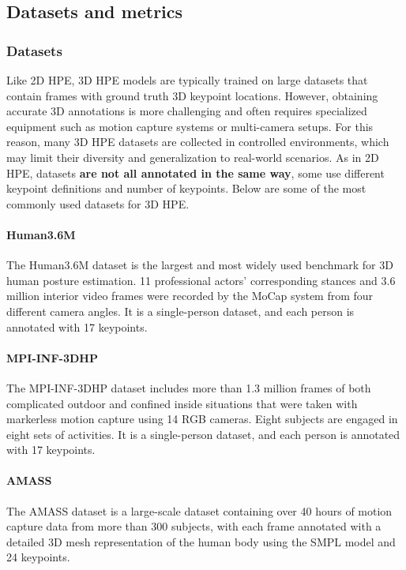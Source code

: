 \subsection{Datasets and metrics}

\subsubsection{Datasets}
Like 2D HPE, 3D HPE models are typically trained on large datasets that contain frames with ground truth 3D keypoint locations. However, obtaining accurate 3D annotations is more challenging and often requires 
specialized equipment such as motion capture systems or multi-camera setups. For this reason, many 3D HPE datasets are collected in controlled environments, which may limit their diversity and generalization to real-world scenarios.
As in 2D HPE, datasets \textbf{are not all annotated in the same way}, some use different keypoint definitions and number of keypoints. Below are some of the most commonly used datasets for 3D HPE.

\paragraph{Human3.6M}
The Human3.6M dataset \cite{ionescu2013human3} is the largest and most widely used benchmark for 3D human posture estimation. 11 professional actors' corresponding stances and 3.6 million interior video frames were recorded by the MoCap system from four different 
camera angles. It is a single-person dataset, and each person is annotated with 17 keypoints.

\paragraph{MPI-INF-3DHP}
The MPI-INF-3DHP dataset \cite{mehta2017monocular} includes more than 1.3 million frames of both complicated outdoor and confined inside situations that were taken with markerless motion capture using 14 RGB cameras. Eight subjects are engaged in eight 
sets of activities. It is a single-person dataset, and each person is annotated with 17 keypoints.

\paragraph{AMASS}
The AMASS dataset \cite{mahmood2019amass} is a large-scale dataset containing over 40 hours of motion capture data from more than 300 subjects, with each frame annotated with a detailed 3D mesh representation of the human body using 
the SMPL model and 24 keypoints. 

